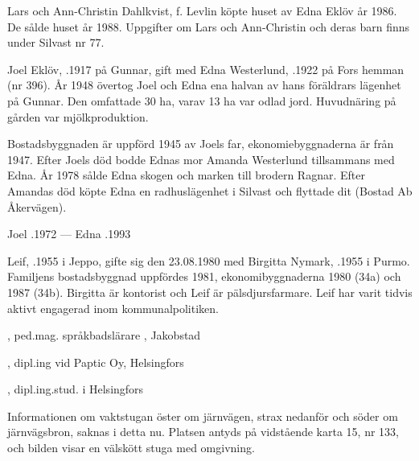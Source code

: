 Lars och Ann-Christin Dahlkvist, f. Levlin  köpte huset av Edna Eklöv år 1986. De sålde huset år 1988. Uppgifter om Lars och Ann-Christin och deras barn finns under Silvast nr 77.


Joel Eklöv, .1917 på Gunnar, gift med Edna Westerlund, .1922 på Fors hemman (nr 396). År 1948 övertog Joel och Edna ena halvan av hans föräldrars lägenhet på Gunnar. Den omfattade 30 ha, varav 13 ha var odlad jord. Huvudnäring på gården var mjölkproduktion.

Bostadsbyggnaden är uppförd 1945 av Joels far, ekonomiebyggnaderna är från 1947. Efter Joels död bodde Ednas mor Amanda Westerlund tillsammans med Edna. År 1978 sålde Edna skogen och marken till brodern Ragnar. Efter Amandas död köpte Edna en radhuslägenhet i Silvast och flyttade dit (Bostad Ab Åkervägen).

Joel .1972  ---  Edna .1993





Leif, .1955 i Jeppo, gifte sig den 23.08.1980 med Birgitta Nymark, .1955 i Purmo. Familjens bostadsbyggnad uppfördes 1981, ekonomibyggnaderna 1980 (34a) och 1987 (34b). Birgitta är kontorist och Leif är pälsdjursfarmare. Leif har varit tidvis aktivt engagerad inom kommunalpolitiken.
\begin{jhchildren}
  \item {}, ped.mag. språkbadslärare , Jakobstad
  \item {}, dipl.ing vid Paptic Oy, Helsingfors
  \item {}, dipl.ing.stud. i Helsingfors
\end{jhchildren}





Informationen om vaktstugan öster om järnvägen, strax nedanför och söder om järnvägsbron, saknas i detta nu. Platsen antyds på vidstående karta 15, nr 133, och bilden visar en välskött stuga med omgivning.\jhvspace{}
